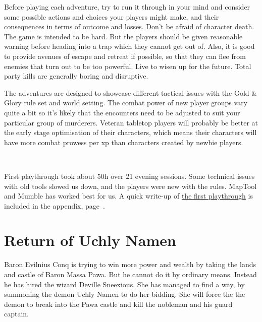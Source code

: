 Before playing each adventure, try to run it through in your mind and consider some possible actions and choices your players might make, and their consequences in terms of outcome and losses. Don't be afraid of character death. The game is intended to be hard. But the players should be given reasonable warning before heading into a trap which they cannot get out of. Also, it is good to provide avenues of escape and retreat if possible, so that they can flee from enemies that turn out to be too powerful. Live to wisen up for the future. Total party kills are generally boring and disruptive.

The adventures are designed to showcase different tactical issues with the Gold \& Glory rule set and world setting. The combat power of new player groups vary quite a bit so it's likely that the encounters need to be adjusted to suit your particular group of murderers. Veteran tabletop players will probably be better at the early stage optimisation of their characters, which means their characters will have more combat prowess per xp than characters created by newbie players.

\

First playthrough took about 50h over 21 evening sessions. Some technical issues with old tools slowed us down, and the players were new with the rules. MapTool and Mumble has worked best for us.
A quick write-up of \hyperref[sec:playthrough]{the first playthrough} is included in the appendix, page~\pageref{sec:playthrough}.





%
%
%
%







\clearpage
\section*{Return of Uchly Namen}

Baron Evilnius Conq is trying to win more power and wealth by taking the lands and castle of Baron Massa Pawa. But he cannot do it by ordinary means. Instead he has hired the wizard Deville Sneexious.
She has managed to find a way, by summoning the demon Uchly Namen to do her bidding. She will force the the demon to break into the Pawa castle and kill the nobleman and his guard captain.

